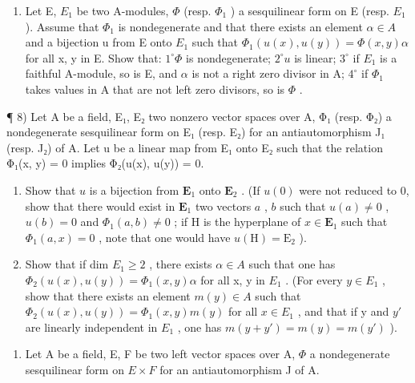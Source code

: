 \begin{enumerate}
\def\labelenumi{\arabic{enumi})}
\setcounter{enumi}{6}
\tightlist
\item
  Let E, \(E_{1}\) be two A-modules, \(\Phi\) (resp. \(\Phi_{1}\) ) a sesquilinear form on E (resp. \(E_{1}\) ). Assume that \(\Phi_{1}\) is nondegenerate and that there exists an element \(\alpha\in A\) and a bijection u from E onto \(E_{1}\) such that \(\Phi_{1}(u(x), u(y))=\Phi(x,y)\alpha\) for all x, y in E. Show that: \(1^{\circ}\Phi\) is nondegenerate; \(2^{\circ}u\) is linear; \(3^{\circ}\) if \(E_{1}\) is a faithful A-module, so is E, and \(\alpha\) is not a right zero divisor in A; \(4^{\circ}\) if \(\Phi_{1}\) takes values in A that are not left zero divisors, so is \(\Phi\) .
\end{enumerate}

¶ 8) Let A be a field, E₁, E₂ two nonzero vector spaces over A, Φ₁ (resp. Φ₂) a nondegenerate sesquilinear form on E₁ (resp. E₂) for an antiautomorphism J₁ (resp. J₂) of A. Let u be a linear map from E₁ onto E₂ such that the relation Φ₁(x, y) = 0 implies Φ₂(u(x), u(y)) = 0.

\begin{enumerate}
\def\labelenumi{\alph{enumi})}
\item
  Show that \(u\) is a bijection from \(\mathbf{E}_{1}\) onto \(\mathbf{E}_{2}\) . (If \(u(0)\) were not reduced to 0, show that there would exist in \(\mathbf{E}_{1}\) two vectors \(a\) , \(b\) such that \(u(a) \neq 0\) , \(u(b) = 0\) and \(\Phi_{1}(a, b) \neq 0\) ; if H is the hyperplane of \(x \in \mathbf{E}_{1}\) such that \(\Phi_{1}(a, x) = 0\) , note that one would have \(u(\mathrm{H}) = \mathrm{E}_{2}\) ).
\item
  Show that if dim \(E_{1} \geqslant 2\) , there exists \(\alpha \in A\) such that one has \(\Phi_{2}(u(x), u(y)) = \Phi_{1}(x, y) \alpha\) for all x, y in \(E_{1}\) . (For every \(y \in E_{1}\) , show that there exists an element \(m(y) \in A\) such that \(\Phi_{2}(u(x), u(y)) = \Phi_{1}(x, y)m(y)\) for all \(x \in E_{1}\) , and that if y and \(y'\) are linearly independent in \(E_{1}\) , one has \(m(y + y') = m(y) = m(y')\) ).
\end{enumerate}

\begin{enumerate}
\def\labelenumi{\arabic{enumi})}
\setcounter{enumi}{8}
\tightlist
\item
  Let A be a field, E, F be two left vector spaces over A, \(\Phi\) a nondegenerate sesquilinear form on \(E \times F\) for an antiautomorphism J of A.
\end{enumerate}

